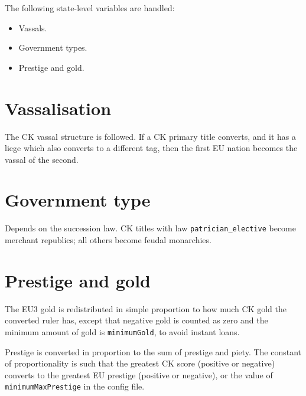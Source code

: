 \documentclass[12pt,ebook,oneside]{book}
\begin{document}
The following state-level variables are handled:
\begin{itemize}
\item Vassals.
\item Government types. 
\item Prestige and gold. 
\end{itemize}

\section{Vassalisation}

The CK vassal structure is followed. If a CK primary title converts,
and it has a liege which also converts to a different tag, then the first EU nation
becomes the vassal of the second. 

\section{Government type}

Depends on the succession law. CK titles with law
\verb|patrician_elective| become merchant republics; all others
become feudal monarchies.

\section{Prestige and gold}

The EU3 gold is redistributed in simple proportion to
how much CK gold the converted ruler has, except that 
negative gold is counted as zero and the minimum amount
of gold is \verb|minimumGold|, to avoid instant loans. 

Prestige is converted in proportion to the sum of prestige and
piety. The constant of proportionality is such that the greatest
CK score (positive or negative) converts to the greatest EU prestige
(positive or negative), or the value of \verb|minimumMaxPrestige| in
the config file. 
\end{document}
